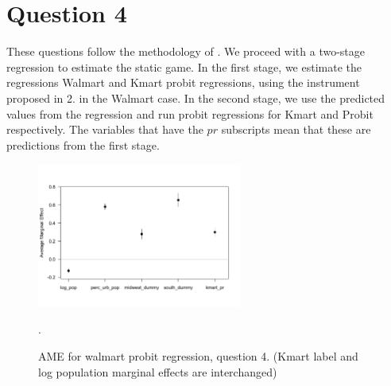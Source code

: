 \documentclass{article}
\theoremstyle{definition}
\begin{document}
\section*{Question 4}

These questions follow the methodology of \cite{bajari2010estimating}. We proceed with a two-stage regression to estimate the static game. In the first stage, we estimate the regressions Walmart and Kmart probit regressions, using the instrument proposed in 2. in the Walmart case. In the second stage, we use the predicted values from the regression and run probit regressions for Kmart and Probit respectively. The variables that have the $pr$ subscripts mean that these are predictions from the first stage. 

\begin{figure}[h]
\centering
\includegraphics[width=0.6\textwidth]{imgs/ave_4_w.png}
\caption{AME for walmart probit regression, question 4. (Kmart label and log population marginal effects are interchanged)}. 
\end{figure}
\end{document}
